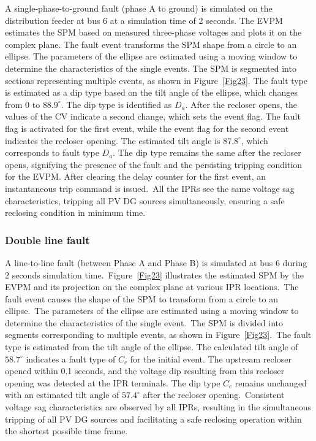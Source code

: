 A single-phase-to-ground fault (phase A to ground) is simulated on the distribution feeder at bus 6 at a simulation time of 2 seconds. The EVPM estimates the SPM based on measured three-phase voltages and plots it on the complex plane. The fault event transforms the SPM shape from a circle to an ellipse. The parameters of the ellipse are estimated using a moving window to determine the characteristics of the single events. The SPM is segmented into sections representing multiple events, as shown in Figure~\ref{Fig23}. The fault type is estimated as a dip type based on the tilt angle of the ellipse, which changes from 0 to $88.9^\circ$. The dip type is identified as $D_a$. After the recloser opens, the values of the CV indicate a second change, which sets the event flag. The fault flag is activated for the first event, while the event flag for the second event indicates the recloser opening. The estimated tilt angle is $87.8^\circ$, which corresponds to fault type $D_a$. The dip type remains the same after the recloser opens, signifying the presence of the fault and the persisting tripping condition for the EVPM. After clearing the delay counter for the first event, an instantaneous trip command is issued.~All the IPRs see the same voltage sag characteristics, tripping all PV DG sources simultaneously, ensuring a safe reclosing condition in minimum time.


\subsubsection{Double line fault}

A line-to-line fault (between Phase A and Phase B) is simulated at bus 6 during 2 seconds simulation time.~Figure~\ref{Fig23} illustrates the estimated SPM by the EVPM and its projection on the complex plane at various IPR locations.~The fault event causes the shape of the SPM to transform from a circle to an ellipse.~The parameters of the ellipse are estimated using a moving window to determine the characteristics of the single event.~The SPM is divided into segments corresponding to multiple events, as shown in Figure~\ref{Fig23}.~The fault type is estimated from the tilt angle of the ellipse. The calculated tilt angle of \(58.7^\circ\) indicates a fault type of \(C_c\) for the initial event. The upstream recloser opened within 0.1 seconds, and the voltage dip resulting from this recloser opening was detected at the IPR terminals. The dip type \(C_c\) remains unchanged with an estimated tilt angle of \(57.4^\circ\) after the recloser opening.~Consistent voltage sag characteristics are observed by all IPRs, resulting in the simultaneous tripping of all PV DG sources and facilitating a safe reclosing operation within the shortest possible time frame.


